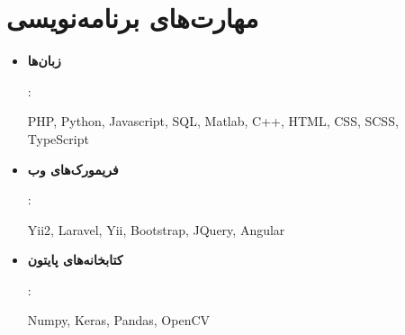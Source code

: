 \documentclass[letterpaper,12pt]{article}
\newcommand{\resumeSubHeadingListStart}{\begin{itemize}[leftmargin=*]}
\newcommand{\resumeSubHeadingListEnd}{\end{itemize}}
\begin{document}
%
\section{مهارت‌های برنامه‌نویسی}
  \resumeSubHeadingListStart
    \item{
      \textbf{زبان‌ها}{:\begin{latin}PHP, Python, Javascript, SQL, Matlab, C++, HTML, CSS, SCSS, TypeScript\end{latin}}
      \hfill
      }
    \item{
      \textbf{فریمورک‌های وب}{:\begin{latin} Yii2, Laravel, Yii, Bootstrap, JQuery, Angular\end{latin}}
      \hfill
      }
     \item{
      \textbf{کتابخانه‌های پایتون}{:\begin{latin} Numpy, Keras, Pandas, OpenCV
\end{latin}}
	}
  \resumeSubHeadingListEnd
\end{document}
